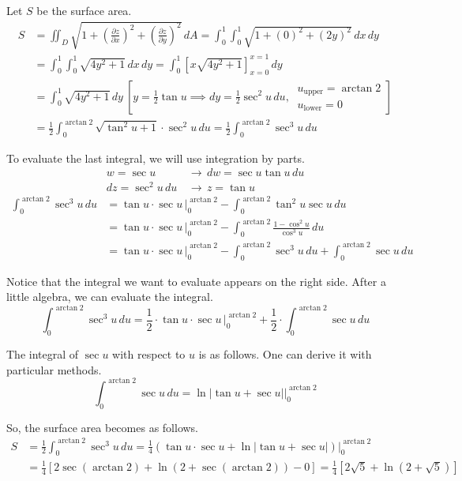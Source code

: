 \documentclass[a4paper, 12pt]{article}
\begin{document}
\begin{enumerate}[leftmargin=*,label=\textbf{\arabic*.}]
\begin{enumerate}[leftmargin=*,label=\textbf{\alph*.}]
Let $S$ be the surface area.
\begin{align*}S&=\iint_D\sqrt{1+\left(\frac{\partial z}{\partial x}\right)^2+\left(\frac{\partial z}{\partial y}\right)^2}\,dA=\int_0^1\int_0^1\sqrt{1+\left(0\right)^2+\left(2y\right)^2}\,dx\,dy\\[1em]&=\int_0^1\int_0^1\sqrt{4y^2+1}\,dx\,dy=\int_0^1\left[x\sqrt{4y^2+1}\right]_{x=0}^{x=1}\,dy\\[1em]&=\int_0^1\sqrt{4y^2+1}\,dy\:\left[y=\frac12\tan u \implies dy=\frac12\sec^2u\,du,\:\begin{array}{l}u_{\text{upper}}=\arctan2\\u_{\text{lower}}=0\end{array}\right]\\[1em]&=\frac12\int_0^{\arctan2}\sqrt{\tan^2u+1}\cdot\sec^2u\,du=\frac12\int_0^{\arctan2}\sec^3u\,du\end{align*}

To evaluate the last integral, we will use integration by parts.
\begin{align*}
    w=\sec u\,&\rightarrow\, dw = \sec u\tan u \,du\\
    dz=\sec^2u\,du\,&\rightarrow\, z = \tan u
\end{align*}
\begin{align*}
\int_0^{\arctan2}\sec^3u\,du&=\tan u \cdot \sec u\,\bigg|_0^{\arctan2} -\int_0^{\arctan2} \tan^2 u\sec u\, du\\[1em]&= \tan u \cdot \sec u\,\bigg|_0^{\arctan2} -\int_0^{\arctan2} \frac{1-\cos^2u}{\cos^3 u}\, du\\[1em]&= \tan u \cdot \sec u\,\bigg|_0^{\arctan2} - \int_0^{\arctan2} \sec^3u \, du + \int_0^{\arctan2} \sec u \, du 
\end{align*}

Notice that the integral we want to evaluate appears on the right side. After a little algebra, we can evaluate the integral.
\[\int_0^{\arctan2}\sec^3u\,du=\frac12\cdot\tan u\cdot\sec u\,\bigg|_0^{\arctan2}+\frac12\cdot\int_0^{\arctan2}\sec u\,du\]

The integral of $\sec u$ with respect to $u$ is as follows. One can derive it with particular methods.
\[\int_0^{\arctan2}\sec u \, du = \ln\left|\tan u + \sec u\right|\bigg|_0^{\arctan2}\]

So, the surface area becomes as follows.
\begin{align*}S&=\frac12\int_0^{\arctan2}\sec^3u\,du=\frac14\left(\tan u\cdot\sec u+\ln\left|\tan u+\sec u\right|\right)\bigg|_0^{\arctan2}\\[1em]&=\frac14\left[2\sec(\arctan2)+ \ln(2+\sec(\arctan2))-0\right]=\boxed{\frac14\left[2\sqrt5+\ln\left(2+\sqrt5\right)\right]}\end{align*}
\end{enumerate}


\end{enumerate}
\end{document}
